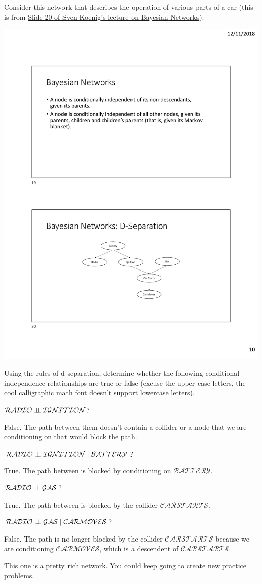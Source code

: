 \documentclass{tufte-handout}
\begin{document}
\begin{exercise}
Consider this network that describes the operation of various parts of a car (this is from \href{http://idm-lab.org/intro-to-ai/slides/Bayesian\_Networks.pdf}{Slide 20 of Sven Koenig's lecture on Bayesian Networks}).

\begin{center}
\includegraphics[width=0.6\linewidth]{figures/carnetwork}
\end{center}

Using the rules of d-separation, determine whether the following conditional independence relationships are true or false (excuse the upper case letters, the cool calligraphic math font doesn't support lowercase letters).
\bi
\item $\mathcal{RADIO} \perp\!\!\!\perp \mathcal{IGNITION}$?
\begin{boxedsolution}
False.  The path between them doesn't contain a collider or a node that we are conditioning on that would block the path. 
\end{boxedsolution}
\item $\mathcal{RADIO} \perp\!\!\!\perp \mathcal{IGNITION}\mid\mathcal{BATTERY}$?
\begin{boxedsolution}
True.  The path between is blocked by conditioning on $\mathcal{BATTERY}$.
\end{boxedsolution}
\item $\mathcal{RADIO} \perp\!\!\!\perp \mathcal{GAS}$?
\begin{boxedsolution}
True.  The path between is blocked by the collider $\mathcal{CAR STARTS}$.
\end{boxedsolution}
\item $\mathcal{RADIO} \perp\!\!\!\perp \mathcal{GAS}\mid\mathcal{CAR MOVES}$?
\begin{boxedsolution}
False.  The path is no longer blocked by the collider $\mathcal{CAR STARTS}$ because we are conditioning $\mathcal{CAR MOVES}$, which is a descendent of $\mathcal{CAR STARTS}$.
\end{boxedsolution}
\item This one is a pretty rich network.  You could keep going to create new practice problems.
\ei
\end{exercise}
\end{document}
